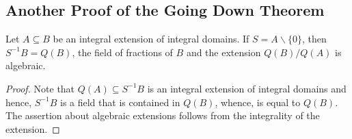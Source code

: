 \subsection{Another Proof of the Going Down Theorem}
\begin{lemma}
    Let $A\subseteq B$ be an integral extension of integral domains. If $S = A\backslash\{0\}$, then $S^{-1}B = Q(B)$, the field of fractions of $B$ and the extension $Q(B)/Q(A)$ is algebraic.
\end{lemma}
\begin{proof}
    Note that $Q(A)\subseteq S^{-1}B$ is an integral extension of integral domains and hence, $S^{-1}B$ is a field that is contained in $Q(B)$, whence, is equal to $Q(B)$. The assertion about algebraic extensions follows from the integrality of the extension.
\end{proof}

